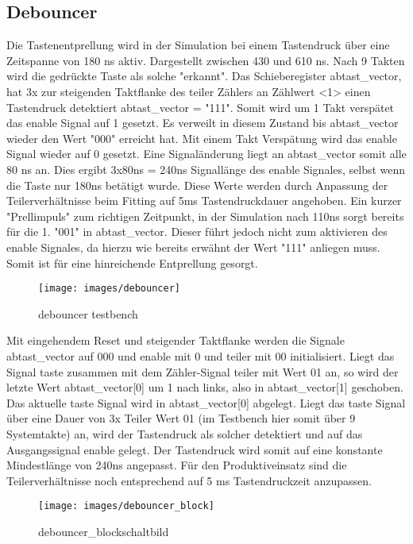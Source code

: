 \subsection{Debouncer}
Die Tastenentprellung wird in der Simulation bei einem Tastendruck über eine Zeitspanne von 180 ns aktiv.
Dargestellt zwischen 430 und 610 ns. Nach 9 Takten wird die gedrückte Taste als solche "erkannt".
Das Schieberegister abtast\_vector, hat 3x zur steigenden Taktflanke des teiler Zählers an Zählwert <1>
einen Tastendruck detektiert abtast\_vector = "111". Somit wird um 1 Takt verspätet das enable Signal auf 1 gesetzt.
Es verweilt in diesem Zustand bis abtast\_vector wieder den Wert "000" erreicht hat. Mit einem Takt Verspätung wird 
das enable Signal wieder auf 0 gesetzt. Eine Signaländerung liegt an abtast\_vector somit alle 80 ns an.
Dies ergibt 3x80ns = 240ns Signallänge des enable Signales, selbst wenn die Taste nur 180ns betätigt wurde.
Diese Werte werden durch Anpassung der Teilerverhältnisse beim Fitting auf 5ms Tastendruckdauer angehoben.
Ein kurzer "Prellimpuls" zum richtigen Zeitpunkt, in der Simulation nach 110ns sorgt bereits für die 1. "001" in abtast\_vector.
Dieser führt jedoch nicht zum aktivieren des enable Signales, da hierzu wie bereits erwähnt der Wert "111" anliegen muss.
Somit ist für eine hinreichende Entprellung gesorgt.

	\begin{figure}[H]
		\centering
		\texttt{[image: images/debouncer]}
		\caption{debouncer testbench}
		\label{fig:debouncer}
	\end{figure}
Mit eingehendem Reset und steigender Taktflanke werden die Signale abtast\_vector auf 000 und enable mit 0 und teiler mit 00 initialisiert.
Liegt das Signal taste zusammen mit dem Zähler-Signal teiler mit Wert 01 an, so wird der letzte Wert abtast\_vector[0] um 1 nach links, also in abtast\_vector[1] geschoben.
Das aktuelle taste Signal wird in abtast\_vector[0] abgelegt.
Liegt das taste Signal über eine Dauer von 3x Teiler Wert 01 (im Testbench hier somit über 9 Systemtakte) an, wird der Tastendruck als solcher detektiert und auf das Ausgangssignal enable gelegt.
Der Tastendruck wird somit auf eine konstante Mindestlänge von 240ns angepasst. Für den Produktiveinsatz sind die Teilerverhältnisse noch entsprechend auf 5 ms Tastendruckzeit anzupassen.

\begin{figure}[H]
\centering
\texttt{[image: images/debouncer\_block]}
\caption{debouncer\_blockschaltbild}
\label{fig:debouncer_block}
\end{figure}




